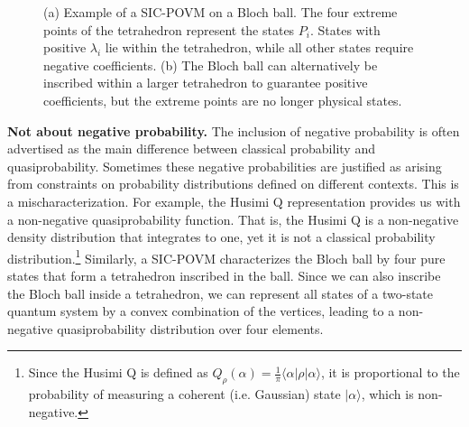 \documentclass[10pt,twocolumn, nofootinbib]{revtex4-2}
\begin{document}
\begin{figure}[H]
\begin{subfigure}[c]{0.23\textwidth}
		\caption{}
	\end{subfigure}
	\caption{(a) Example of a SIC-POVM on a Bloch ball. The four extreme points of the tetrahedron represent the states $P_i$. States with positive $\lambda_i$ lie within the tetrahedron, while all other states require negative coefficients. (b) The Bloch ball can alternatively be inscribed within a larger tetrahedron to guarantee positive coefficients, but the extreme points are no longer physical states.}\label{SIC}
\end{figure}


\textbf{Not about negative probability.} The inclusion of negative probability is often advertised as the main difference between classical probability and quasiprobability. Sometimes these negative probabilities are justified as arising from constraints on probability distributions defined on different contexts. This is a mischaracterization.\cite{ferrie2010,adhikary2020} For example, the Husimi Q representation provides us with a non-negative quasiprobability function. That is, the Husimi Q is a non-negative density distribution that integrates to one, yet it is not a classical probability distribution.\footnote{Since the Husimi Q is defined as $Q_{\rho} ( \alpha ) = \frac{1}{\pi} \langle \alpha | \rho | \alpha \rangle$, it is proportional to the probability of measuring a coherent (i.e. Gaussian) state $| \alpha \rangle$, which is non-negative. } Similarly, a SIC-POVM characterizes the Bloch ball by four pure states that form a tetrahedron inscribed in the ball. Since we can also inscribe the Bloch ball inside a tetrahedron, we can represent all states of a two-state quantum system by a convex combination of the vertices, leading to a non-negative quasiprobability distribution over four elements.
\end{document}
